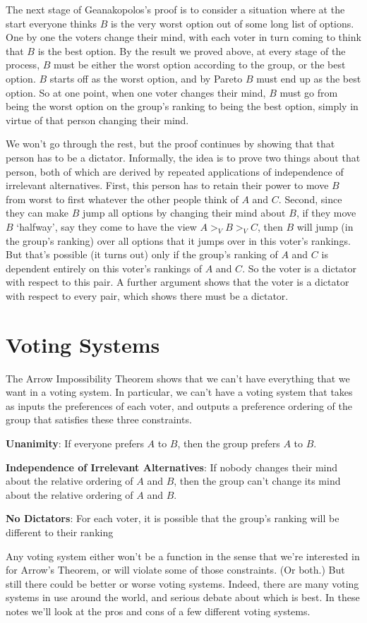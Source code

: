 \documentclass[openany]{book}
\begin{document}
The next stage of Geanakopolos's proof is to consider a situation where at the start everyone thinks $B$ is the very worst option out of some long list of options. One by one the voters change their mind, with each voter in turn coming to think that $B$ is the best option. By the result we proved above, at every stage of the process, $B$ must be either the worst option according to the group, or the best option. $B$ starts off as the worst option, and by Pareto $B$ must end up as the best option. So at one point, when one voter changes their mind, $B$ must go from being the worst option on the group's ranking to being the best option, simply in virtue of that person changing their mind.

We won't go through the rest, but the proof continues by showing that that person has to be a dictator. Informally, the idea is to prove two things about that person, both of which are derived by repeated applications of independence of irrelevant alternatives. First, this person has to retain their power to move $B$ from worst to first whatever the other people think of $A$ and $C$. Second, since they can make $B$ jump all options by changing their mind about $B$, if they move $B$ `halfway', say they come to have the view $A >_V B >_V C$, then $B$ will jump (in the group's ranking) over all options that it jumps over in this voter's rankings. But that's possible (it turns out) only if the group's ranking of $A$ and $C$ is dependent entirely on this voter's rankings of $A$ and $C$. So the voter is a dictator with respect to this pair. A further argument shows that the voter is a dictator with respect to every pair, which shows there must be a dictator.

\section{Voting Systems}

The Arrow Impossibility Theorem shows that we can't have everything that we want in a voting system. In particular, we can't have a voting system that takes as inputs the preferences of each voter, and outputs a preference ordering of the group that satisfies these three constraints.

\begin{enumerate*}
\item \textbf{Unanimity}: If everyone prefers $A$ to $B$, then the group prefers $A$ to $B$.
\item \textbf{Independence of Irrelevant Alternatives}: If nobody changes their mind about the relative ordering of $A$ and $B$, then the group can't change its mind about the relative ordering of $A$ and $B$.
\item \textbf{No Dictators}: For each voter, it is possible that the group's ranking will be different to their ranking
\end{enumerate*}
Any voting system either won't be a function in the sense that we're interested in for Arrow's Theorem, or will violate some of those constraints. (Or both.) But still there could be better or worse voting systems. Indeed, there are many voting systems in use around the world, and serious debate about which is best. In these notes we'll look at the pros and cons of a few different voting systems.
\end{document}
